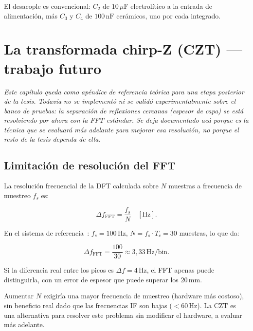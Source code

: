 \documentclass[12pt, a4paper, twoside]{report}
\begin{document}
El desacople es convencional: $C_2$ de $10\,\mu\text{F}$ electrolítico a la
entrada de alimentación, más $C_3$ y $C_4$ de $100\,\text{nF}$ cerámicos,
uno por cada integrado.

\chapter{La transformada chirp-Z (CZT) — trabajo futuro}
\label{ap:czt}

\textit{Este capítulo queda como apéndice de referencia teórica para
una etapa posterior de la tesis. Todavía no se implementó ni se
validó experimentalmente sobre el banco de pruebas: la separación de
reflexiones cercanas (espesor de capa) se está resolviendo por ahora
con la FFT estándar. Se deja documentado acá porque es la técnica que
se evaluará más adelante para mejorar esa resolución, no porque el
resto de la tesis dependa de ella.}

\section{Limitación de resolución del FFT}
\label{sec:limitacion_fft}

La resolución frecuencial de la DFT calculada sobre $N$ muestras a
frecuencia de muestreo $f_s$ es:

\begin{equation}
  \Delta f_\text{FFT} = \frac{f_s}{N}\quad[\text{Hz}].
  \label{eq:res_fft}
\end{equation}

En el sistema de referencia~\cite{Huang2022}: $f_s = 100\,\text{Hz}$,
$N = f_s \cdot T_c = 30$ muestras, lo que da:

\begin{equation*}
  \Delta f_\text{FFT} = \frac{100}{30} \approx 3{,}33\,\text{Hz/bin}.
\end{equation*}

Si la diferencia real entre los picos es $\Delta f = 4\,\text{Hz}$,
el FFT apenas puede distinguirla, con un error de espesor que puede
superar los $20\,\text{mm}$.

Aumentar $N$ exigiría una mayor frecuencia de muestreo (hardware más
costoso), sin beneficio real dado que las frecuencias IF son bajas
($< 60\,\text{Hz}$). La CZT es una alternativa para resolver este
problema sin modificar el hardware, a evaluar más adelante.
\end{document}
